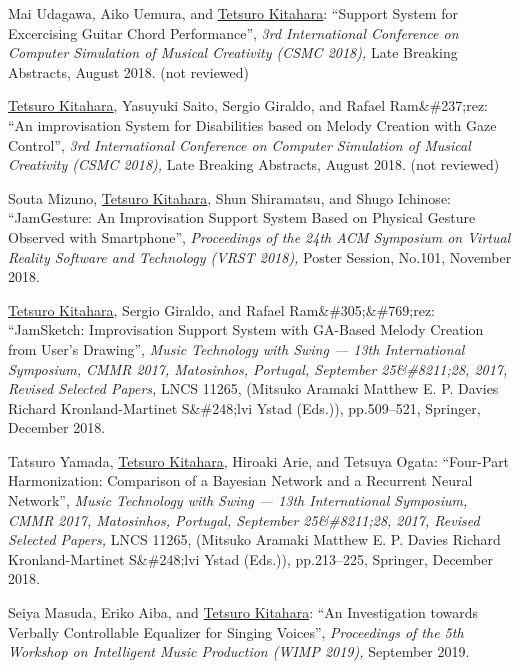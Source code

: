\begin{Enumerate}
\item 
Mai Udagawa, 
Aiko Uemura, 
and 
\underline{Tetsuro Kitahara}: 
    ``Support System for Excercising Guitar Chord Performance'', 
    {\it 3rd International Conference on Computer Simulation of Musical Creativity (CSMC 2018),
    } Late Breaking Abstracts, August 2018. 
(not reviewed)
\item 
\underline{Tetsuro Kitahara}, 
Yasuyuki Saito, 
Sergio Giraldo, 
and 
Rafael Ram\&\#237;rez: 
    ``An improvisation System for Disabilities based on Melody Creation with Gaze Control'', 
    {\it 3rd International Conference on Computer Simulation of Musical Creativity (CSMC 2018),
    } Late Breaking Abstracts, August 2018. 
(not reviewed)
\item 
Souta Mizuno, 
\underline{Tetsuro Kitahara}, 
Shun Shiramatsu, 
and 
Shugo Ichinose: 
    ``JamGesture: An Improvisation Support System Based on Physical Gesture Observed with Smartphone'', 
    {\it Proceedings of the 24th ACM Symposium on Virtual Reality Software and Technology (VRST 2018),
    } Poster Session, No.101, November 2018. 

\item 
\underline{Tetsuro Kitahara}, 
Sergio Giraldo, 
and 
Rafael Ram\&\#305;\&\#769;rez: 
    ``JamSketch: Improvisation Support
System with GA-Based Melody Creation
from User’s Drawing'', 
    {\it Music Technology with Swing --- 13th International Symposium, CMMR 2017, Matosinhos, Portugal, September 25\&\#8211;28, 2017, Revised Selected Papers,
    } LNCS 11265, (Mitsuko Aramaki
Matthew E. P. Davies
Richard Kronland-Martinet
S\&\#248;lvi Ystad (Eds.)), pp.509--521, Springer, December 2018. 

\item 
Tatsuro Yamada, 
\underline{Tetsuro Kitahara}, 
Hiroaki Arie, 
and 
Tetsuya Ogata: 
    ``Four-Part Harmonization: Comparison
of a Bayesian Network and a Recurrent
Neural Network'', 
    {\it Music Technology with Swing --- 13th International Symposium, CMMR 2017, Matosinhos, Portugal, September 25\&\#8211;28, 2017, Revised Selected Papers,
    } LNCS 11265, (Mitsuko Aramaki
Matthew E. P. Davies
Richard Kronland-Martinet
S\&\#248;lvi Ystad (Eds.)), pp.213--225, Springer, December 2018. 

\item 
Seiya Masuda, 
Eriko Aiba, 
and 
\underline{Tetsuro Kitahara}: 
    ``An Investigation towards Verbally Controllable Equalizer for Singing Voices'', 
    {\it Proceedings of the 5th Workshop on Intelligent Music Production (WIMP 2019),
    } September 2019. 


\end{Enumerate}
